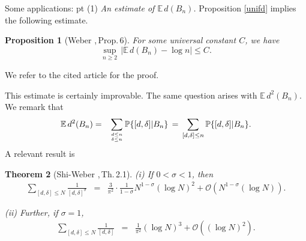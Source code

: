 \documentclass[11pt,draft,reqno]{amsart}
\newtheorem{theorem}{Theorem}[section]
\newtheorem{proposition}[theorem]{Proposition}
\theoremstyle{definition}
\theoremstyle{remarks}
\numberwithin{equation}{section}
\def \d{{\delta}}
\def \s{{\sigma}}
\def \noi{{\noindent}}
\def\P{{\mathcal P}}
\def\E{{\mathbb E \,}}
\def\P{{\mathbb P}}
\begin{document}
{Some applications}:
 pt
\noi(1) {\it An estimate  of $\E d(   B_{ n})$.} Proposition \ref{unifd}  implies the following estimate.
\begin{proposition}[Weber \cite{W11},\,Prop.\,6] \label{dbn} For  some universal constant $C$, we have 
$$ \sup_{n\ge 2}\, \big| \E d(   B_{ n})- \log n \big| \le C   .$$  \end{proposition}
We refer to the cited article  for the proof.
\smallskip \par
\noi This estimate is certainly improvable. The same question arises with $\E d^2(   B_{ n})$.  We remark that \begin{eqnarray}\E d^2(B_n)&=&
\sum_{   d \le n\atop    \d  \le n}\P\{ [d,\d]|B_n\}\, =\, 
 \sum_{ [d,\d]\le n}\P\{ [d,\d]|B_n\}
.
\end{eqnarray}
 A relevant result is    \begin{theorem}[Shi-Weber \cite{Sh.We},\,Th.\,2.1] \label{shi.weber}
  {\rm (i)}   If $0<\s< 1$, then
 \begin{eqnarray*}
 \sum_{ [d,\d]\le N}  \frac{1}{[d,\d]^{\s }}
 &=&\frac 3{\pi^2} \cdot \frac 1{1-\s}N^{1-\s} (\log N)^2+\mathcal O\left( N^ {1-\s}(\log N)\right).
\end{eqnarray*}
 
{\rm (ii)} Further, if $\s =1$,
 \begin{eqnarray*}
 \sum_{ [d,\d]\le N}  \frac{1}{[d,\d]}
 &=&\frac 1{\pi^2} (\log N)^3+\mathcal O\left((\log N)^2\right).
\end{eqnarray*}
\end{theorem}
\end{document}
